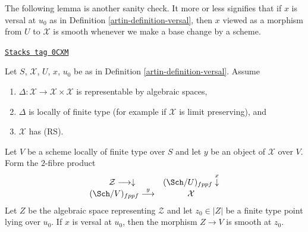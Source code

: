 The following lemma is another sanity check. It more or less
signifies that if $x$ is versal at $u_0$ as in
Definition \ref{artin-definition-versal},
then $x$ viewed as a morphism from $U$ to $\mathcal{X}$ is
smooth whenever we make a base change by a scheme.

\begin{lemma}
\label{artin-lemma-base-change-versal}
\href{https://stacks.math.columbia.edu/tag/0CXM}{\texttt{Stacks tag 0CXM}}

Let $S$, $\mathcal{X}$, $U$, $x$, $u_0$ be as in
Definition \ref{artin-definition-versal}. Assume
\begin{enumerate}
\item $\Delta : \mathcal{X} \to \mathcal{X} \times \mathcal{X}$
is representable by algebraic spaces,
\item $\Delta$ is locally of finite type
(for example if $\mathcal{X}$ is limit preserving), and
\item $\mathcal{X}$ has (RS).
\end{enumerate}
Let $V$ be a scheme locally of finite type over $S$
and let $y$ be an object of $\mathcal{X}$ over $V$.
Form the $2$-fibre product
$$
\begin{array}{cc}\mathcal{Z} \longrightarrow\downarrow & (\Sch/U)_{fppf} \overset{x}{\downarrow} \\ (\Sch/V)_{fppf} \overset{y}{\longrightarrow} & \mathcal{X}\end{array}
$$
Let $Z$ be the algebraic space representing $\mathcal{Z}$
and let $z_0 \in |Z|$ be a finite type point lying over $u_0$.
If $x$ is versal at $u_0$, then
the morphism $Z \to V$ is smooth at $z_0$.
\end{lemma}

